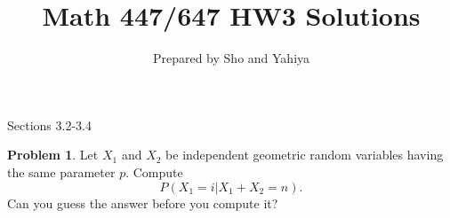 \documentclass[10pt]{article}
\theoremstyle{definition}
\newtheorem{problem}{Problem}
\begin{document}
 
\title{Math 447/647 HW3 Solutions}
\author{Prepared by Sho and Yahiya}
\date{}
\maketitle
 
 Sections 3.2-3.4






\begin{problem}
Let $X_1$ and $X_2$ be independent geometric random variables having the same
parameter $p$. Compute
\[
P\left(X_1 = i | X_1 + X_2 = n\right).
\]
Can you guess the answer before you compute it?
\end{problem}
\end{document}
